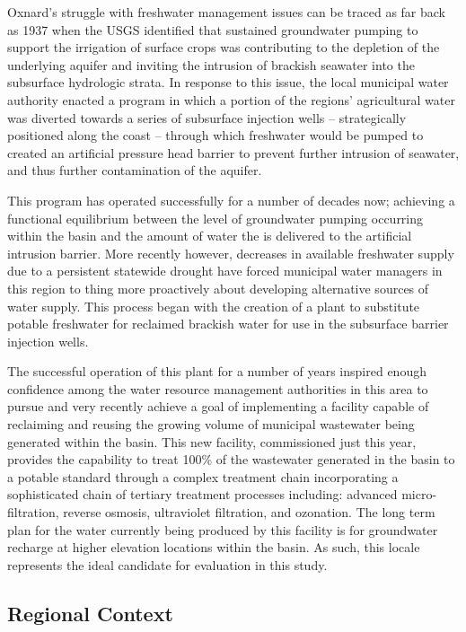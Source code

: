 Oxnard's struggle with freshwater management issues can be traced as far back as 1937 when the USGS identified that sustained groundwater pumping to support the irrigation of surface crops was contributing to the depletion of the underlying aquifer and inviting the intrusion of brackish seawater into the subsurface hydrologic strata. In response to this issue, the local municipal water authority enacted a program in which a portion of the regions' agricultural water was diverted towards a series of subsurface injection wells -- strategically positioned along the coast -- through which freshwater would be pumped to created an artificial pressure head barrier to prevent further intrusion of seawater, and thus further contamination of the aquifer. 

This program has operated successfully for a number of decades now; achieving a functional equilibrium between the level of groundwater pumping occurring within the basin and the amount of water the is delivered to the artificial intrusion barrier. More recently however, decreases in available freshwater supply due to a persistent statewide drought have forced municipal water managers in this region to thing more proactively about developing alternative sources of water supply. This process began with the creation of a plant to substitute potable freshwater for reclaimed brackish water for use in the subsurface barrier injection wells. 

The successful operation of this plant for a number of years inspired enough confidence among the water resource management authorities in this area to pursue and very recently achieve a goal of implementing a facility capable of reclaiming and reusing the growing volume of municipal wastewater being generated within the basin. This new facility, commissioned just this year, provides the capability to treat 100\% of the wastewater generated in the basin to a potable standard through a complex treatment chain incorporating a sophisticated chain of tertiary treatment processes including: advanced micro-filtration, reverse osmosis, ultraviolet filtration, and ozonation. The long term plan for the water currently being produced by this facility is for groundwater recharge at higher elevation locations within the basin. As such, this locale represents the ideal candidate for evaluation in this study. 

    \subsection{Regional Context}
    
